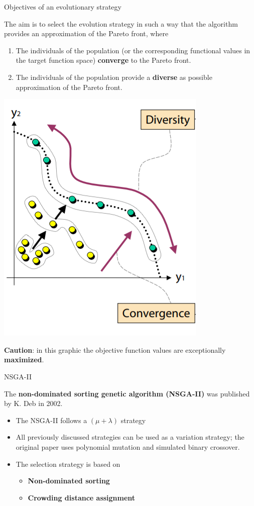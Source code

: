 \begin{frame}[allowframebreaks]{Objectives of an evolutionary strategy}

The aim is to select the evolution strategy in such a way that the algorithm provides an approximation of the Pareto front, where

\begin{enumerate}
\item The individuals of the population (or the corresponding functional values in the target function space) \textbf{converge} to the Pareto front.
\item The individuals of the population provide a \textbf{diverse} as possible approximation of the Pareto front.
\end{enumerate}

\vspace*{-0.3cm}

\begin{center}
\includegraphics[width = 0.25\linewidth]{images/EMO_goals.png}
\end{center}

\vspace*{-0.5cm}

\begin{footnotesize}
\textbf{Caution}: in this graphic the objective function values are exceptionally \textbf{maximized}.
\end{footnotesize}

\end{frame}

\begin{frame}[allowframebreaks]{NSGA-II}

The \textbf{non-dominated sorting genetic algorithm (NSGA-II)} was published by K. Deb in 2002.

\begin{itemize}
\item The NSGA-II follows a $(\mu + \lambda)$ strategy
\item All previously discussed strategies can be used as a variation strategy; the original paper uses polynomial mutation and simulated binary crossover.
\item The selection strategy is based on
\begin{itemize}
\item \textbf{Non-dominated sorting}
\item \textbf{Crowding distance assignment}
\end{itemize}
\end{itemize}

\end{frame}

